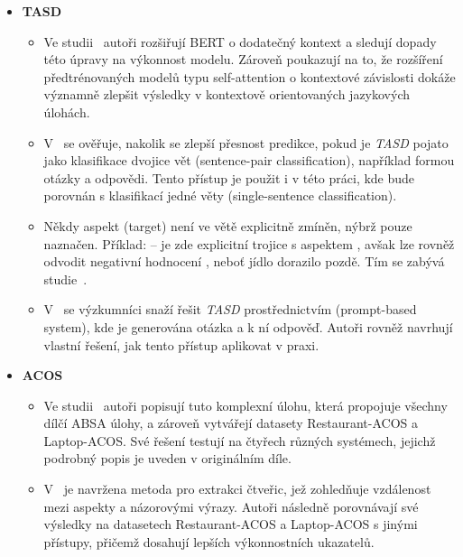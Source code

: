\begin{itemize}
    \item \textbf{TASD}
    \begin{itemize}
        \item Ve studii~\cite{wu2020contextguidedberttargetedaspectbased} autoři rozšiřují BERT o dodatečný kontext a sledují dopady této úpravy na výkonnost modelu. Zároveň poukazují na to, že rozšíření předtrénovaných modelů typu self-attention o kontextové závislosti dokáže významně zlepšit výsledky v kontextově orientovaných jazykových úlohách.
        \item V~\cite{sun-etal-2019-utilizing} se ověřuje, nakolik se zlepší přesnost predikce, pokud je \emph{TASD} pojato jako klasifikace dvojice vět (sentence-pair classification), například formou otázky a odpovědi. Tento přístup je použit i v této práci, kde bude porovnán s klasifikací jedné věty (single-sentence classification).
        \item Někdy aspekt (target) není ve větě explicitně zmíněn, nýbrž pouze naznačen. Příklad:  -- je zde explicitní trojice s aspektem , avšak lze rovněž odvodit negativní hodnocení , neboť jídlo dorazilo pozdě. Tím se zabývá studie~\cite{Wan_Yang_Du_Liu_Qi_Pan_2020}.
        \item V~\cite{Ke2023} se výzkumníci snaží řešit \emph{TASD} prostřednictvím  (prompt-based system), kde je generována otázka a k ní odpověď. Autoři rovněž navrhují vlastní řešení, jak tento přístup aplikovat v praxi.
    \end{itemize}

    \item \textbf{ACOS}
    \begin{itemize}
        \item Ve studii~\cite{cai-etal-2021-aspect} autoři popisují tuto komplexní úlohu, která propojuje všechny dílčí ABSA úlohy, a zároveň vytvářejí datasety Restaurant-ACOS a Laptop-ACOS. Své řešení testují na čtyřech různých systémech, jejichž podrobný popis je uveden v originálním díle.
        \item V~\cite{Li2023-wo} je navržena metoda pro extrakci čtveřic, jež zohledňuje vzdálenost mezi aspekty a názorovými výrazy. Autoři následně porovnávají své výsledky na datasetech Restaurant-ACOS a Laptop-ACOS s jinými přístupy, přičemž dosahují lepších výkonnostních ukazatelů.
    \end{itemize}

\end{itemize}

